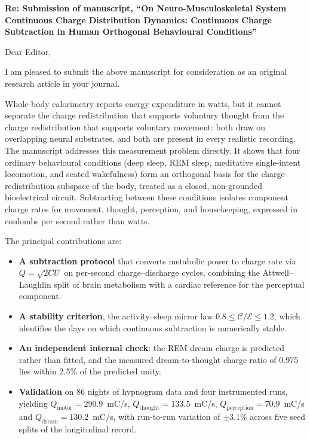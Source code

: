 


\textbf{Re: Submission of manuscript, ``On Neuro-Musculoskeletal System Continuous Charge Distribution Dynamics: Continuous Charge Subtraction in Human Orthogonal Behavioural Conditions''}

Dear Editor,

I am pleased to submit the above manuscript for consideration as an original research article in your journal.

Whole-body calorimetry reports energy expenditure in watts, but it cannot separate the charge redistribution that supports voluntary thought from the charge redistribution that supports voluntary movement: both draw on overlapping neural substrates, and both are present in every realistic recording. The manuscript addresses this measurement problem directly. It shows that four ordinary behavioural conditions (deep sleep, REM sleep, meditative single-intent locomotion, and seated wakefulness) form an orthogonal basis for the charge-redistribution subspace of the body, treated as a closed, non-grounded bioelectrical circuit. Subtracting between these conditions isolates component charge rates for movement, thought, perception, and housekeeping, expressed in coulombs per second rather than watts.

The principal contributions are:
\begin{itemize}[leftmargin=1.2em,itemsep=0.25em]
\item \textbf{A subtraction protocol} that converts metabolic power to charge rate via $Q=\sqrt{2CU}$ on per-second charge--discharge cycles, combining the Attwell--Laughlin split of brain metabolism with a cardiac reference for the perceptual component.
\item \textbf{A stability criterion}, the activity--sleep mirror law $0.8 \le \mathcal{C}/\mathcal{E} \le 1.2$, which identifies the days on which continuous subtraction is numerically stable.
\item \textbf{An independent internal check}: the REM dream charge is predicted rather than fitted, and the measured dream-to-thought charge ratio of 0.975 lies within 2.5\% of the predicted unity.
\item \textbf{Validation} on 86 nights of hypnogram data and four instrumented runs, yielding $Q_{\mathrm{motor}} = 290.9$~mC/s, $Q_{\mathrm{thought}} = 133.5$~mC/s, $Q_{\mathrm{perception}} = 70.9$~mC/s and $Q_{\mathrm{dream}} = 130.2$~mC/s, with run-to-run variation of $\pm 3.1\%$ across five seed splits of the longitudinal record.
\end{itemize}


